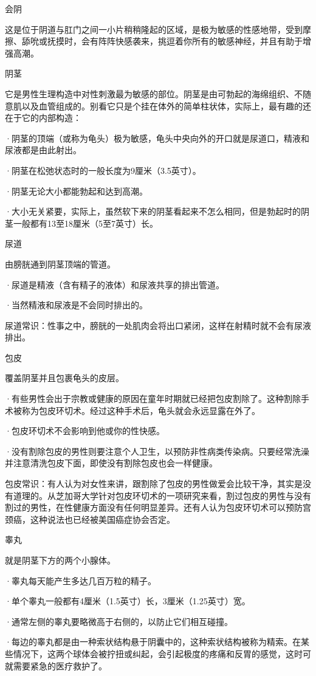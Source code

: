 \documentclass[12pt,UTF8]{ctexbook}
\begin{document}
会阴

这是位于阴道与肛门之间一小片稍稍隆起的区域，是极为敏感的性感地带，受到摩擦、舔吮或抚摸时，会有阵阵快感袭来，挑逗着你所有的敏感神经，并且有助于增强高潮。


阴茎

它是男性生理构造中对性刺激最为敏感的部位。阴茎是由可勃起的海绵组织、不随意肌以及血管组成的。别看它只是个挂在体外的简单柱状体，实际上，最有趣的还在于它的内部构造：

·阴茎的顶端（或称为龟头）极为敏感，龟头中央向外的开口就是尿道口，精液和尿液都是由此射出。

·阴茎在松弛状态时的一般长度为9厘米（3.5英寸）。

·阴茎无论大小都能勃起和达到高潮。

·大小无关紧要，实际上，虽然软下来的阴茎看起来不怎么相同，但是勃起时的阴茎一般都有13至18厘米（5至7英寸）长。

尿道

由膀胱通到阴茎顶端的管道。

·尿道是精液（含有精子的液体）和尿液共享的排出管道。

·当然精液和尿液是不会同时排出的。

尿道常识：性事之中，膀胱的一处肌肉会将出口紧闭，这样在射精时就不会有尿液排出。

包皮

覆盖阴茎并且包裹龟头的皮层。

·有些男性会出于宗教或健康的原因在童年时期就已经把包皮割除了。这种割除手术被称为包皮环切术。经过这种手术后，龟头就会永远显露在外了。

·包皮环切术不会影响到他或你的性快感。

·没有割除包皮的男性则要注意个人卫生，以预防非性病类传染病。只要经常洗澡并注意清洗包皮下面，即使没有割除包皮也会一样健康。

包皮常识：有人认为对女性来讲，跟割除了包皮的男性做爱会比较干净，其实是没有道理的。从芝加哥大学针对包皮环切术的一项研究来看，割过包皮的男性与没有割过的男性，在性健康方面没有任何明显差异。还有人认为包皮环切术可以预防宫颈癌，这种说法也已经被美国癌症协会否定。

睾丸

就是阴茎下方的两个小腺体。

·睾丸每天能产生多达几百万粒的精子。

·单个睾丸一般都有4厘米（1.5英寸）长，3厘米（1.25英寸）宽。

·通常左侧的睾丸要略微高于右侧的，以防止它们相互碰撞。

·每边的睾丸都是由一种索状结构悬于阴囊中的，这种索状结构被称为精索。在某些情况下，这两个球体会被拧扭或纠起，会引起极度的疼痛和反胃的感觉，这时可就需要紧急的医疗救护了。
\end{document}
